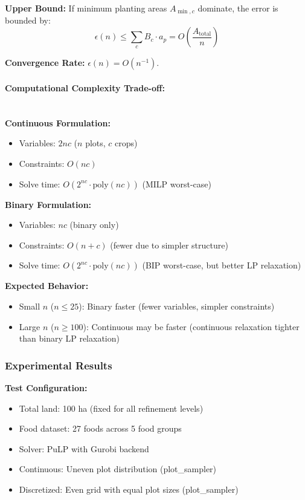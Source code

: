 \documentclass{oqireport}
\begin{document}
\textbf{Upper Bound:} If minimum planting areas $A_{\min,c}$ dominate, the error is bounded by:
$$\epsilon(n) \leq \sum_c B_c \cdot a_p = O\left(\frac{A_{\text{total}}}{n}\right)$$

\textbf{Convergence Rate:} $\epsilon(n) = O(n^{-1})$.

\paragraph{Computational Complexity Trade-off:}\\

\textbf{Continuous Formulation:}
\begin{itemize}
    \item Variables: $2nc$ ($n$ plots, $c$ crops)
    \item Constraints: $O(nc)$
    \item Solve time: $O(2^{nc} \cdot \text{poly}(nc))$ (MILP worst-case)
\end{itemize}

\textbf{Binary Formulation:}
\begin{itemize}
    \item Variables: $nc$ (binary only)
    \item Constraints: $O(n + c)$ (fewer due to simpler structure)
    \item Solve time: $O(2^{nc} \cdot \text{poly}(nc))$ (BIP worst-case, but better LP relaxation)
\end{itemize}

\textbf{Expected Behavior:}
\begin{itemize}
    \item Small $n$ ($n \leq 25$): Binary faster (fewer variables, simpler constraints)
    \item Large $n$ ($n \geq 100$): Continuous may be faster (continuous relaxation tighter than binary LP relaxation)
\end{itemize}

\subsubsection{Experimental Results}

\textbf{Test Configuration:}
\begin{itemize}
    \item Total land: 100 ha (fixed for all refinement levels)
    \item Food dataset: 27 foods across 5 food groups
    \item Solver: PuLP with Gurobi backend
    \item Continuous: Uneven plot distribution (plot\_sampler)
    \item Discretized: Even grid with equal plot sizes (plot\_sampler)
\end{itemize}
\end{document}
